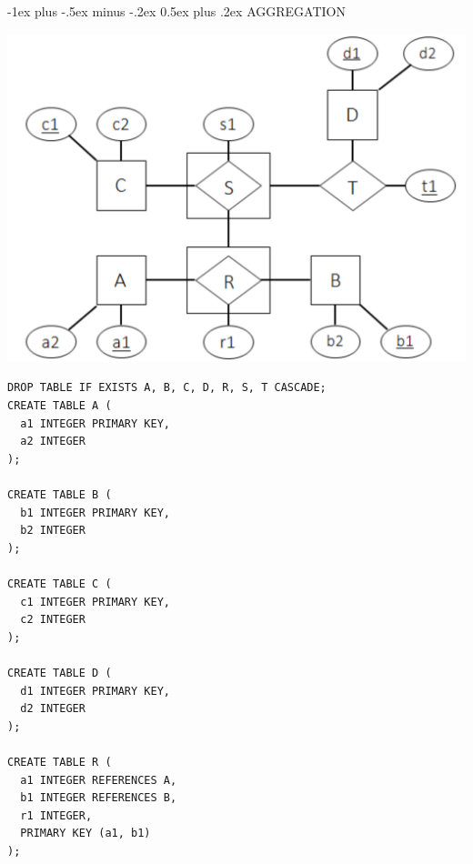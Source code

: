 \documentclass[10pt, landscape]{article}
\makeatletter
\renewcommand{\section}{\@startsection{section}{1}{0mm}%
  {-1ex plus -.5ex minus -.2ex}%
  {0.5ex plus .2ex}%
{\normalfont\large\bfseries}}
\makeatother
\begin{document}
\raggedright
\footnotesize
\begin{center}
\end{center}

\begin{multicols*}{3}

  \setlength{\columnseprule}{0.25pt}
  \setlength{\premulticols}{1pt}
  \setlength{\postmulticols}{1pt}
  \setlength{\multicolsep}{1pt}
  \setlength{\columnsep}{2pt}

  \section{AGGREGATION}
  \begin{tightcenter}
    \includegraphics[width=0.85\linewidth]{cs2102-er-model-aggregation.png} 
  \end{tightcenter}
  \begin{lstlisting}[style=mySQL]
DROP TABLE IF EXISTS A, B, C, D, R, S, T CASCADE;
CREATE TABLE A (
  a1 INTEGER PRIMARY KEY,
  a2 INTEGER
);

CREATE TABLE B (
  b1 INTEGER PRIMARY KEY,
  b2 INTEGER
);

CREATE TABLE C (
  c1 INTEGER PRIMARY KEY,
  c2 INTEGER
);

CREATE TABLE D (
  d1 INTEGER PRIMARY KEY,
  d2 INTEGER 
);

CREATE TABLE R (
  a1 INTEGER REFERENCES A, 
  b1 INTEGER REFERENCES B,
  r1 INTEGER,
  PRIMARY KEY (a1, b1) 
);


\end{lstlisting}
\end{multicols*}
\end{document}
